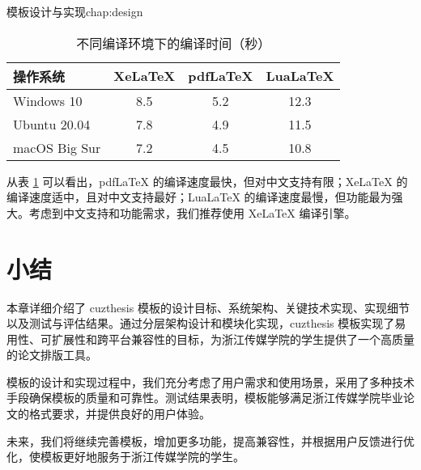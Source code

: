 \begin{cuzchapter}{模板设计与实现}{chap:design}
	\begin{table}[htbp]
		\caption{不同编译环境下的编译时间（秒）}
		\label{tab:compile-time}
		\centering
		\begin{tabular}{lccc}
			\toprule
			操作系统 & XeLaTeX & pdfLaTeX & LuaLaTeX \\
			\midrule
			Windows 10 & 8.5 & 5.2 & 12.3 \\
			Ubuntu 20.04 & 7.8 & 4.9 & 11.5 \\
			macOS Big Sur & 7.2 & 4.5 & 10.8 \\
			\bottomrule
		\end{tabular}
	\end{table}
	
	从表 \ref{tab:compile-time} 可以看出，pdfLaTeX 的编译速度最快，但对中文支持有限；XeLaTeX 的编译速度适中，且对中文支持最好；LuaLaTeX 的编译速度最慢，但功能最为强大。考虑到中文支持和功能需求，我们推荐使用 XeLaTeX 编译引擎。
	
	\section{小结}\label{sec:design-summary}
	
	本章详细介绍了 cuzthesis 模板的设计目标、系统架构、关键技术实现、实现细节以及测试与评估结果。通过分层架构设计和模块化实现，cuzthesis 模板实现了易用性、可扩展性和跨平台兼容性的目标，为浙江传媒学院的学生提供了一个高质量的论文排版工具。
	
	模板的设计和实现过程中，我们充分考虑了用户需求和使用场景，采用了多种技术手段确保模板的质量和可靠性。测试结果表明，模板能够满足浙江传媒学院毕业论文的格式要求，并提供良好的用户体验。
	
	未来，我们将继续完善模板，增加更多功能，提高兼容性，并根据用户反馈进行优化，使模板更好地服务于浙江传媒学院的学生。

\end{cuzchapter}
